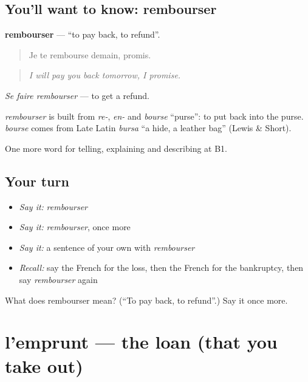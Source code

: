 \subsection*{You'll want to know: rembourser}
\textbf{rembourser} — \textquotedblleft{}to pay back, to refund\textquotedblright{}.

\begin{quote}
Je te rembourse demain, promis.
\end{quote}

\begin{quote}
\emph{I will pay you back tomorrow, I promise.}
\end{quote}

\emph{Se faire rembourser} — to get a refund.

\begin{cousinweb}
\emph{rembourser} is built from \emph{re-}, \emph{en-} and \emph{bourse} \textquotedblleft{}purse\textquotedblright{}: to put back into the purse. \emph{bourse} comes from Late Latin \emph{bursa} \textquotedblleft{}a hide, a leather bag\textquotedblright{} (Lewis \& Short).
\end{cousinweb}

\begin{grammarlens}[title={What you've built}]
One more word for telling, explaining and describing at B1.
\end{grammarlens}

\subsection*{Your turn}
\begin{itemize}
\raggedright
  \item \emph{Say it:} \emph{rembourser}
  \item \emph{Say it:} \emph{rembourser}, once more
  \item \emph{Say it:} a sentence of your own with \emph{rembourser}
  \item \emph{Recall:} say the French for the loss, then the French for the bankruptcy, then say \emph{rembourser} again
\end{itemize}

\begin{tcolorbox}[breakable,colback=teal!4,colframe=teal!35!black,title={Before you move on}]
What does rembourser mean? (\textquotedblleft{}To pay back, to refund\textquotedblright{}.) Say it once more.
\end{tcolorbox}
\section[l'emprunt]{l'emprunt — the loan (that you take out)}

